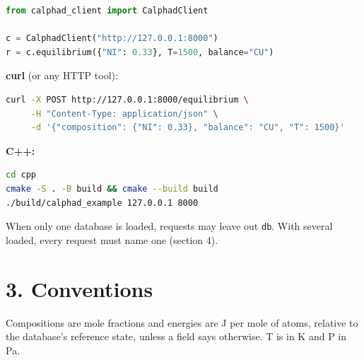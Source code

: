 \documentclass[12pt,a4paper]{article}
\begin{document}
\begin{lstlisting}[basicstyle={\footnotesize\ttfamily},language=Python]
from calphad_client import CalphadClient

c = CalphadClient("http://127.0.0.1:8000")
r = c.equilibrium({"NI": 0.33}, T=1500, balance="CU")
\end{lstlisting}
\textbf{curl} (or any HTTP tool):

\begin{lstlisting}[basicstyle={\footnotesize\ttfamily},language=bash]
curl -X POST http://127.0.0.1:8000/equilibrium \
     -H "Content-Type: application/json" \
     -d '{"composition": {"NI": 0.33}, "balance": "CU", "T": 1500}'
\end{lstlisting}
\textbf{C++:}

\begin{lstlisting}[basicstyle={\footnotesize\ttfamily},language=bash]
cd cpp
cmake -S . -B build && cmake --build build
./build/calphad_example 127.0.0.1 8000
\end{lstlisting}
When only one database is loaded, requests may leave out \texttt{\textquotedbl{}db\textquotedbl{}}. With several loaded, every request must name one (section 4).


\section*{3. Conventions}
Compositions are mole fractions and energies are J per mole of atoms, relative to the database's reference state, unless a field says otherwise. T is in K and P in Pa.


\end{document}
